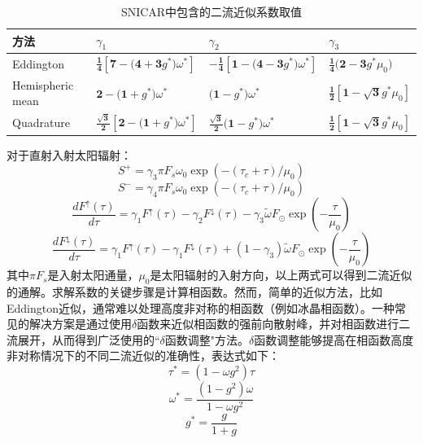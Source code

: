 \begin{table}[htbp]
\centering
\caption{SNICAR中包含的二流近似系数取值}
\label{tab:SNICAR二流近似系数}
\begin{tabular}{llll}
\toprule
方法 & $\gamma_{1}$ & $\gamma_{2}$ & $\gamma_{3}$ \\ \midrule
Eddington &
\(\frac{\mathbf{1}}{\mathbf{4}}\left\lbrack \mathbf{7 - (4 + 3}g^{*})\omega^{*} \right\rbrack\)
&
\(- \frac{\mathbf{1}}{\mathbf{4}}\left\lbrack \mathbf{1 - (4 - 3}g^{*})\omega^{*} \right\rbrack\)
& \(\frac{\mathbf{1}}{\mathbf{4}}\mathbf{(2 - 3}g^{*}\mu_{0})\) \\
Hemispheric mean & \(\mathbf{2 - (1 +}g^{*})\omega^{*}\) &
\(\mathbf{(1 -}g^{*})\omega^{*}\) &
\(\frac{\mathbf{1}}{\mathbf{2}}\left\lbrack \mathbf{1 -}\sqrt{\mathbf{3}}g^{*}\mu_{0} \right\rbrack\) \\
Quadrature &
\(\frac{\sqrt{\mathbf{3}}}{\mathbf{2}}\left\lbrack \mathbf{2 - (1 +}g^{*})\omega^{*} \right\rbrack\)
& \(\frac{\sqrt{\mathbf{3}}}{\mathbf{2}}\mathbf{(1 -}g^{*})\omega^{*}\)
&
\(\frac{\mathbf{1}}{\mathbf{2}}\left\lbrack \mathbf{1 -}\sqrt{\mathbf{3}}g^{*}\mu_{0} \right\rbrack\) \\ \bottomrule
\end{tabular}
\end{table}

对于直射入射太阳辐射：
\begin{equation}
S^{+} = \gamma_{3}\pi F_{s}\omega_{0}\exp\left( - \left( \tau_{c} + \tau \right)/\mu_{0} \right)
\end{equation}
\begin{equation}
S^{-} = \gamma_{4}\pi F_{s}\omega_{0}\exp\left( - \left( \tau_{c} + \tau \right)/\mu_{0} \right)
\end{equation}
\begin{equation}
\frac{dF^{\uparrow}(\tau)}{d\tau} = \gamma_{1}F^{\uparrow}(\tau) - \gamma_{2}F^{\downarrow}(\tau) - \gamma_{3}\widetilde{\omega}F_{\odot}\exp( - \frac{\tau}{\mu_{0}})
\end{equation}
\begin{equation}
\frac{dF^{\downarrow}(\tau)}{d\tau} = \gamma_{1}F^{\uparrow}(\tau) - \gamma_{1}F^{\downarrow}(\tau) + (1 - \gamma_{3})\widetilde{\omega}F_{\odot}\exp( - \frac{\tau}{\mu_{0}})
\end{equation}
其中\(\pi F_{s}\)是入射太阳通量，\(\mu_{0}\)是太阳辐射的入射方向，以上两式可以得到二流近似的通解。求解系数的关键步骤是计算相函数。然而，简单的近似方法，比如Eddington近似，通常难以处理高度非对称的相函数（例如冰晶相函数）。一种常见的解决方案是通过使用$\delta$函数来近似相函数的强前向散射峰，并对相函数进行二流展开，从而得到广泛使用的``$\delta$函数调整"方法\citep{joseph1976DeltaEddingtonApproximationRadiative}。$\delta$函数调整能够提高在相函数高度非对称情况下的不同二流近似的准确性，表达式如下：
\begin{equation}
\tau^{*} = (1 - \omega g^{2})\tau
\end{equation}
\begin{equation}
\omega^{*} = \frac{(1 - g^{2})\omega}{1 - \omega g^{2}}
\end{equation}
\begin{equation}
g^{*} = \frac{g}{1 + g}
\end{equation}

